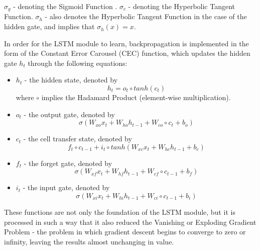 {$\sigma _{g}$} - denoting the Sigmoid Function \citep{DavidE.Rumelhart1986Lrbb}.
{$\sigma _{c}$} - denoting the Hyperbolic Tangent Function.
{$\sigma _{h}$} - also denotes the Hyperbolic Tangent Function in the case of the hidden gate, and implies that {$\sigma _{h}(x)=x$}.

In order for the LSTM module to learn, backpropagation is implemented in the form of the Constant Error Carousel (CEC) function, which updates the hidden gate {$h_{t}$} through the following equations:

\begin{itemize}
	\item {$h_{t}$} -  the hidden state, denoted by 
	\begin{equation} \label{LSTM CEC}
	h_{t} = o_{t} \circ tanh(c_{t})
	\end{equation}
	where {$\circ$} implies the Hadamard Product (element-wise multiplication).
	\item {$o_{t}$} - the output gate, denoted by 
	\begin{equation} \label{output gate equation}
		\sigma(W_{xo}x_{t} + W_{ho}h_{t-1} + W_{co} \circ c_{t} + b_{o})
	\end{equation}
	\item {$c_{t}$} - the cell transfer state, denoted by 
	\begin{equation} \label{cell state equation}
		f_{t} \circ c_{t-1}+ i_{t} \circ tanh(W_{xc}x_{t} + W_{hc}h_{t-1} + b_{c})
	\end{equation}
	\item {$f_{t}$} - the forget gate, denoted by 
	\begin{equation} \label{forget gate equation}
		\sigma(W_{xf}x_{t} + W_{hf}h_{t-1} + W_{cf} \circ c_{t-1} + b_{f})
	\end{equation}
	\item {$i_{t}$} - the input gate, denoted by 
	\begin{equation} \label{input gate equation}
		\sigma(W_{xi}x_{t} + W_{hi}h_{t-1} + W_{ci} \circ c_{t-1} + b_{i})
	\end{equation}
	
\end{itemize}

These functions are not only the foundation of the LSTM module, but it is processed in such a way that it also reduced the Vanishing or Exploding Gradient Problem  - the problem in which gradient descent begins to converge to zero or infinity, leaving the results almost unchanging in value.\citep{chapter-gradient-flow-2001}\\

